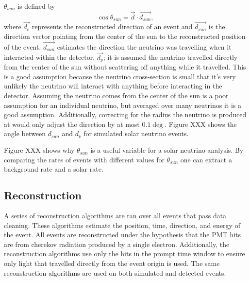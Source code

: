 $\theta_{sun}$ is defined by
\begin{equation}
\cos\theta_{sun} = \vec{d}\cdot\vec{d_{sun}}\text{, }
\end{equation}
where $\vec{d_{e}}$ represents the reconstructed direction of an event and
$\vec{d_{sun}}$ is the direction vector pointing from the center of the sun to
the reconstructed position of the event.
$\vec{d_{sun}}$ estimates the direction the neutrino was travelling when it interacted
within the detector, $\vec{d_{\nu}}$; it is assumed the neutrino travelled directly
from the center of the sun without scattering off anything while it travelled.
This is a good assumption because the neutrino cross-section is small that it's very
unlikely the neutrino will interact with anything before interacting in the detector.
Assuming the neutrino comes from the center of the sun is a poor assumption for an individual
neutrino, but averaged over many neutrinos it is a good assumption.
Additionally, correcting for the radius the neutrino is produced at would only adjust
the direction by at most $0.1\deg$.
Figure XXX shows the angle between $d_{sun}$ and $d_{\nu}$ for simulated solar neutrino
events.

Figure XXX shows why $\theta_{sun}$ is a useful variable for a solar neutrino analysis.
By comparing the rates of events with different values for $\theta_{sun}$ one can
extract a background rate and a solar rate.

\subsection{Reconstruction}
A series of reconstruction algorithms are ran over all events that pass data cleaning.
These algorithms estimate the position, time, direction, and energy of the event.
All events are reconstructed under the hypothesis that the PMT hits are from cherekov radiation
produced by a single electron.
Additionally, the reconstruction algorithms use only the hits in the prompt time window to ensure only light
that travelled directly from the event origin is used.
The same reconstruction algorithms are used on both simulated and detected events.

